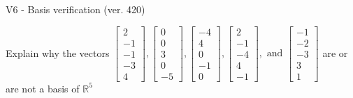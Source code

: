 \begin{exercise}
  \begin{exerciseTitle}V6 - Basis verification (ver. 420)\end{exerciseTitle}
  \begin{exerciseStatement}
    Explain why the vectors \(\left[\begin{array}{r}
2 \\
-1 \\
-1 \\
-3 \\
4
\end{array}\right] , \left[\begin{array}{r}
0 \\
0 \\
3 \\
0 \\
-5
\end{array}\right] , \left[\begin{array}{r}
-4 \\
4 \\
0 \\
-1 \\
0
\end{array}\right] , \left[\begin{array}{r}
2 \\
-1 \\
-4 \\
4 \\
-1
\end{array}\right] , \text{ and } \left[\begin{array}{r}
-1 \\
-2 \\
-3 \\
3 \\
1
\end{array}\right]\) are or are not a basis of \(\mathbb{R}^5\)	



\end{exerciseStatement}
\end{exercise}
